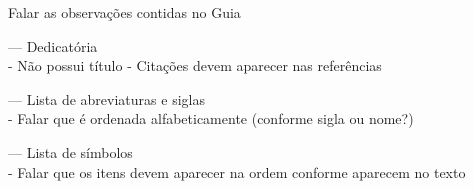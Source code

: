 Falar as observações contidas no Guia

--- Dedicatória\\
    - Não possui título
    - Citações devem aparecer nas referências

--- Lista de abreviaturas e siglas\\
    - Falar que é ordenada alfabeticamente (conforme sigla ou nome?)

--- Lista de símbolos\\
    - Falar que os itens devem aparecer na ordem conforme aparecem no texto